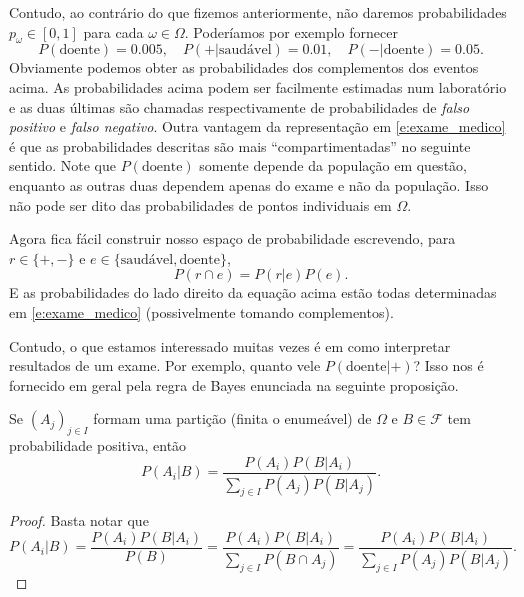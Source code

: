 Contudo, ao contrário do que fizemos anteriormente, não daremos probabilidades $p_\omega \in [0,1]$ para cada $\omega \in \Omega$.
Poderíamos por exemplo fornecer
\begin{equation}
  \label{e:exame_medico}
  P(\text{doente}) = 0.005, \quad P( + | \text{saudável}) = 0.01, \quad P( - | \text{doente}) = 0.05.
\end{equation}
Obviamente podemos obter as probabilidades dos complementos dos eventos acima.
As probabilidades acima podem ser facilmente estimadas num laboratório e as duas últimas são chamadas respectivamente de probabilidades de \emph{falso positivo} e \emph{falso negativo}.
Outra vantagem da representação em \eqref{e:exame_medico} é que as probabilidades descritas são mais ``compartimentadas'' no seguinte sentido.
Note que $P(\text{doente})$ somente depende da população em questão, enquanto as outras duas dependem apenas do exame e não da população.
Isso não pode ser dito das probabilidades de pontos individuais em $\Omega$.

Agora fica fácil construir nosso espaço de probabilidade escrevendo, para $r \in \{+, -\}$ e $e \in \{\text{saudável}, \text{doente}\}$,
\begin{equation}
  P(r \cap e) = P(r | e) P(e).
\end{equation}
E as probabilidades do lado direito da equação acima estão todas determinadas em \eqref{e:exame_medico} (possivelmente tomando complementos).

Contudo, o que estamos interessado muitas vezes é em como interpretar resultados de um exame.
Por exemplo, quanto vele $P(\text{doente} | +)$?
Isso nos é fornecido em geral pela regra de Bayes enunciada na seguinte proposição.

\begin{proposition}
  Se $(A_j)_{j\in I}$ formam uma partição (finita o enumeável) de $\Omega$ e $B \in \mathcal{F}$ tem probabilidade positiva, então
  \begin{equation}
    P(A_i | B) = \frac{P(A_i) P(B | A_i)}{\sum_{j\in I} P(A_j) P(B | A_j)}.
  \end{equation}
\end{proposition}

\begin{proof}
  Basta notar que
  \begin{equation}
    P(A_i | B) = \frac{P(A_i) P(B | A_i)}{P(B)} = \frac{P(A_i) P(B | A_i)}{\sum_{j\in I} P(B \cap A_j)} = \frac{P(A_i) P(B | A_i)}{\sum_{j\in I} P(A_j) P(B | A_j)}.
  \end{equation}
\end{proof}

